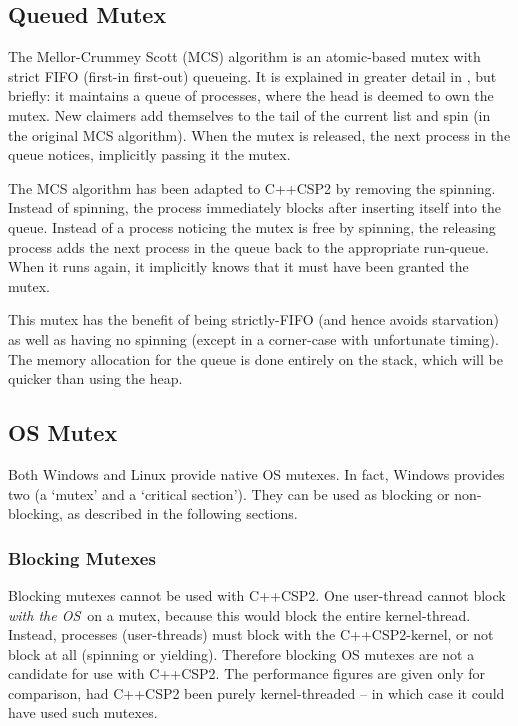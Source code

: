 \documentclass[12pt]{IOS-Book-Article-CPA-2007}
\begin{document}
\subsection{Queued Mutex}

The Mellor-Crummey Scott (MCS) algorithm is an atomic-based mutex with strict FIFO (first-in first-out) queueing.  It is explained in greater detail in \cite{mellor-crummey-scott-91}, 
but briefly: it maintains a queue of processes, where the head is deemed to own the mutex.  New claimers add themselves to the tail of the current 
list and spin (in the original MCS algorithm).  When the mutex is released, the next process in the queue notices, implicitly passing it the mutex.  

The MCS algorithm has been adapted to C++CSP2 by removing the spinning.  Instead of spinning, the process immediately blocks after inserting itself
into the queue.  Instead of a process noticing the mutex is free by spinning, the releasing process adds the next process in the queue back to the
appropriate run-queue.  When it runs again, it implicitly knows that it must have been granted the mutex.

This mutex has the benefit of being strictly-FIFO (and hence avoids starvation) as well as having no spinning (except in a corner-case with 
unfortunate timing).  The memory allocation for the queue is done entirely on the stack, which will be quicker than using the heap.

\subsection{OS Mutex}

Both Windows and Linux provide native OS mutexes.  In fact, Windows provides two (a `mutex' and a `critical section').  They can be used as blocking
or non-blocking, as described in the following sections.

\subsubsection{Blocking Mutexes}

Blocking mutexes cannot be used with C++CSP2.  One user-thread cannot block \textit{with the OS}~on a mutex, because this would block the entire kernel-thread.
Instead, processes (user-threads) must block with the C++CSP2-kernel, or not block at all (spinning or yielding).  Therefore blocking OS mutexes are
not a candidate for use with C++CSP2.  The performance figures are given only for comparison, had C++CSP2 been purely kernel-threaded -- in which 
case it could have used such mutexes.
\end{document}
